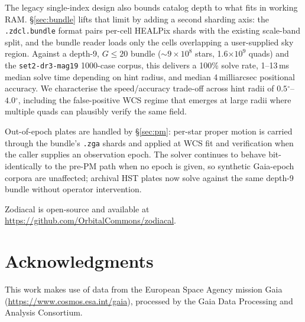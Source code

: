 \documentclass[twocolumn, 10pt]{article}
\newcommand{\degr}{\ensuremath{^{\circ}}}
\begin{document}
The legacy single-index design also bounds catalog depth to what
fits in working RAM. \S\ref{sec:bundle} lifts that limit by adding a
second sharding axis: the \texttt{.zdcl.bundle} format pairs
per-cell HEALPix shards with the existing scale-band split, and the
bundle reader loads only the cells overlapping a user-supplied sky
region. Against a depth-9, $G \le 20$ bundle ($\sim$$9 \times 10^8$
stars, 1.6$\times 10^9$ quads) and the \texttt{set2-dr3-mag19}
1000-case corpus, this delivers a 100\% solve rate, 1--13\,ms median
solve time depending on hint radius, and median 4\,milliarcsec
positional accuracy. We characterise the speed/accuracy trade-off
across hint radii of $0.5\degr$--$4.0\degr$, including the
false-positive WCS regime that emerges at large radii where multiple
quads can plausibly verify the same field.

Out-of-epoch plates are handled by \S\ref{sec:pm}: per-star proper
motion is carried through the bundle's \texttt{.zga} shards and
applied at WCS fit and verification when the caller supplies an
observation epoch. The solver continues to behave bit-identically to
the pre-PM path when no epoch is given, so synthetic Gaia-epoch
corpora are unaffected; archival HST plates now solve against the
same depth-9 bundle without operator intervention.

Zodiacal is open-source and available at
\url{https://github.com/OrbitalCommons/zodiacal}.

\section*{Acknowledgments}

This work makes use of data from the European Space Agency mission
Gaia (\url{https://www.cosmos.esa.int/gaia}), processed by the Gaia
Data Processing and Analysis Consortium.



\end{document}
